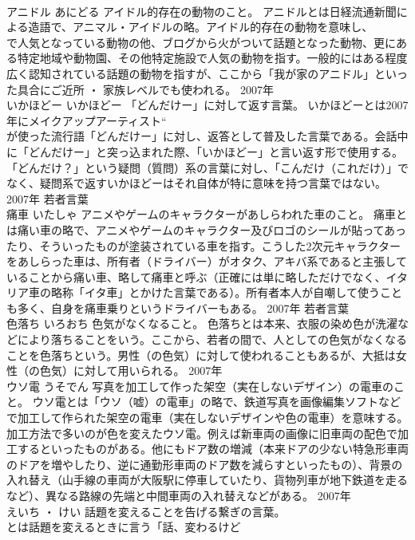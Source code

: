 \documentclass[8pt]{extreport}
\begin{document}
\begin{CJK}{UTF8}{min}
\\	アニドル	あにどる	アイドル的存在の動物のこと。	アニドルとは日経流通新聞による造語で、アニマル・アイドルの略。アイドル的存在の動物を意味し、
\\	で人気となっている動物の他、ブログから火がついて話題となった動物、更にある特定地域や動物園、その他特定施設で人気の動物を指す。一般的にはある程度広く認知されている話題の動物を指すが、ここから「我が家のアニドル」といった具合にご近所 ・ 家族レベルでも使われる。	2007年	
\\	いかほどー	いかほどー	「どんだけー」に対して返す言葉。	いかほどーとは2007年にメイクアップアーティスト“
\\	が使った流行語「どんだけー」に対し、返答として普及した言葉である。会話中に「どんだけー」と突っ込まれた際、「いかほどー」と言い返す形で使用する。「どんだけ？」という疑問（質問）系の言葉に対し、「こんだけ（これだけ）」でなく、疑問系で返すいかほどーはそれ自体が特に意味を持つ言葉ではない。	2007年	若者言葉	
\\	痛車	いたしゃ	アニメやゲームのキャラクターがあしらわれた車のこと。	痛車とは痛い車の略で、アニメやゲームのキャラクター及びロゴのシールが貼ってあったり、そういったものが塗装されている車を指す。こうした2次元キャラクターをあしらった車は、所有者（ドライバー）がオタク、アキバ系であると主張していることから痛い車、略して痛車と呼ぶ（正確には単に略しただけでなく、イタリア車の略称「イタ車」とかけた言葉である）。所有者本人が自嘲して使うことも多く、自身を痛車乗りというドライバーもある。	2007年	若者言葉	
\\	色落ち	いろおち	色気がなくなること。	色落ちとは本来、衣服の染め色が洗濯などにより落ちることをいう。ここから、若者の間で、人としての色気がなくなることを色落ちという。男性（の色気）に対して使われることもあるが、大抵は女性（の色気）に対して用いられる。	2007年	
\\	ウソ電	うそでん	写真を加工して作った架空（実在しないデザイン）の電車のこと。	ウソ電とは「ウソ（嘘）の電車」の略で、鉄道写真を画像編集ソフトなどで加工して作られた架空の電車（実在しないデザインや色の電車）を意味する。加工方法で多いのが色を変えたウソ電。例えば新車両の画像に旧車両の配色で加工するといったものがある。他にもドア数の増減（本来ドアの少ない特急形車両のドアを増やしたり、逆に通勤形車両のドア数を減らすといったもの）、背景の入れ替え（山手線の車両が大阪駅に停車していたり、貨物列車が地下鉄道を走るなど）、異なる路線の先端と中間車両の入れ替えなどがある。	2007年	
\\	えいち ・ けい	話題を変えることを告げる繋ぎの言葉。	
\\	とは話題を変えるときに言う「話、変わるけど

\end{CJK}
\end{document}
